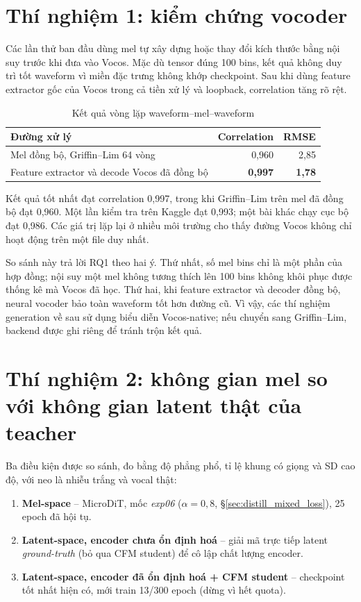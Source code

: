 \documentclass[a4paper,13pt,oneside]{report}
\begin{document}
\section{Thí nghiệm 1: kiểm chứng vocoder}
\label{sec:e1_vocoder}

Các lần thử ban đầu dùng mel tự xây dựng hoặc thay đổi kích thước bằng nội suy trước khi đưa vào Vocos. Mặc dù tensor đúng 100 bins, kết quả không duy trì tốt waveform vì miền đặc trưng không khớp checkpoint. Sau khi dùng feature extractor gốc của Vocos trong cả tiền xử lý và loopback, correlation tăng rõ rệt.

\begin{table}[H]
\centering
\caption{Kết quả vòng lặp waveform--mel--waveform}
\label{tab:vocoder_results}
\small
\begin{tabularx}{\textwidth}{Xrr}
\toprule
\textbf{Đường xử lý} & \textbf{Correlation} & \textbf{RMSE} \\
\midrule
Mel đồng bộ, Griffin--Lim 64 vòng & 0,960 & 2,85 \\
Feature extractor và decode Vocos đã đồng bộ & \textbf{0,997} & \textbf{1,78} \\
\bottomrule
\end{tabularx}
\end{table}

Kết quả tốt nhất đạt correlation 0,997, trong khi Griffin--Lim trên mel đã đồng bộ đạt 0,960. Một lần kiểm tra trên Kaggle đạt 0,993; một bài khác chạy cục bộ đạt 0,986. Các giá trị lặp lại ở nhiều môi trường cho thấy đường Vocos không chỉ hoạt động trên một file duy nhất.

So sánh này trả lời RQ1 theo hai ý. Thứ nhất, số mel bins chỉ là một phần của hợp đồng; nội suy một mel không tương thích lên 100 bins không khôi phục được thống kê mà Vocos đã học. Thứ hai, khi feature extractor và decoder đồng bộ, neural vocoder bảo toàn waveform tốt hơn đường cũ. Vì vậy, các thí nghiệm generation về sau sử dụng biểu diễn Vocos-native; nếu chuyển sang Griffin--Lim, backend được ghi riêng để tránh trộn kết quả.

\section{Thí nghiệm 2: không gian mel so với không gian latent thật của teacher}
\label{sec:exp4_mel_vs_latent}

Ba điều kiện được so sánh, đo bằng độ phẳng phổ, tỉ lệ khung có giọng và
SD cao độ, với neo là nhiễu trắng và vocal thật:
\begin{enumerate}[label=(\Alph*)]
 \item \textbf{Mel-space} -- MicroDiT, mốc \emph{exp06} ($\alpha=0{,}8$,
   \S\ref{sec:distill_mixed_loss}), 25 epoch đã hội tụ.
 \item \textbf{Latent-space, encoder chưa ổn định hoá} -- giải mã trực tiếp latent
   \emph{ground-truth} (bỏ qua CFM student) để cô lập chất lượng encoder.
 \item \textbf{Latent-space, encoder đã ổn định hoá + CFM student} -- checkpoint tốt nhất
   hiện có, mới train 13/300 epoch (dừng vì hết quota).
\end{enumerate}
\end{document}
